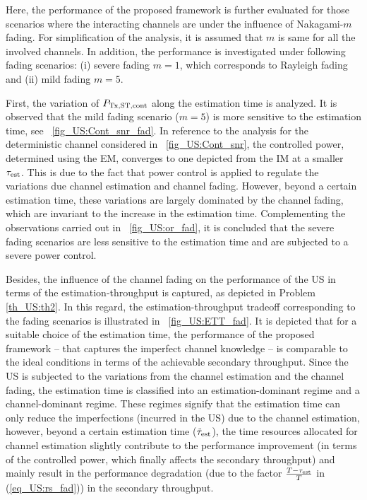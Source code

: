 Here, the performance of the proposed framework is further evaluated for those scenarios where the interacting channels are under the influence of Nakagami-$m$ fading. For simplification of the analysis, it is assumed that $m$ is same for all the involved channels. In addition, the performance is investigated under following fading scenarios: (i) severe fading $m=1$, which corresponds to Rayleigh fading
and (ii) mild fading $m = 5$. 

First, the variation of $P_{\text{Tx,ST,cont}}$ along the estimation time is analyzed. It is observed that the mild fading scenario ($m = 5$) is more sensitive to the estimation time, see \figurename~\ref{fig_US:Cont_snr_fad}. In reference to the analysis for the deterministic channel considered in \figurename~\ref{fig_US:Cont_snr}, the controlled power, determined using the EM, converges to one depicted from the IM at a smaller $\tau_{\text{est}}$. This is due to the fact that power control is applied to regulate the variations due channel estimation and channel fading. However, beyond a certain estimation time, these variations are largely dominated by the channel fading, which are invariant to the increase in the estimation time. Complementing the observations carried out in \figurename~\ref{fig_US:or_fad}, it is concluded that the severe fading scenarios are less sensitive to the estimation time and are subjected to a severe power control.
 

Besides, the influence of the channel fading on the performance of the US in terms of the estimation-throughput is captured, as depicted in Problem \ref{th_US:th2}. In this regard, the estimation-throughput tradeoff corresponding to the fading scenarios is illustrated in \figurename~\ref{fig_US:ETT_fad}. It is depicted that for a suitable choice of the estimation time, the performance of the proposed framework -- that captures the imperfect channel knowledge -- is comparable to the ideal conditions in terms of the achievable secondary throughput. Since the US is subjected to the variations from the channel estimation and the channel fading, the estimation time is classified into an estimation-dominant regime and a channel-dominant regime. These regimes signify that the estimation time can only reduce the imperfections (incurred in the US) due to the channel estimation, however, beyond a certain estimation time ($\tilde{\tau}_{\text{est}}$), the time resources allocated for channel estimation slightly contribute to the performance improvement (in terms of the controlled power, which finally affects the secondary throughput) and mainly result in the performance degradation (due to the factor $\frac{T - \tau_{\text{est}}}{T}$ in (\ref{eq_US:rs_fad})) in the secondary throughput. 


